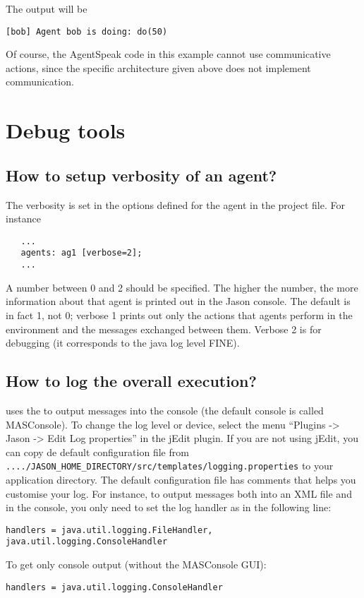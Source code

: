 \documentclass{article}
\newcommand{\jason}[0]{\htlink{\textit{Jason}}{http://jason.sf.net}\xspace}
\begin{document}
The output will be 
\begin{verbatim}
[bob] Agent bob is doing: do(50)
\end{verbatim}

Of course, the AgentSpeak code in this example cannot use communicative
actions, since the specific architecture given above does not implement
communication.

\section{Debug tools}

\subsection{How to setup verbosity of an agent?}

The verbosity is set in the options defined for the agent in the project file. For instance

\begin{verbatim}
   ... 
   agents: ag1 [verbose=2];
   ...
\end{verbatim}

A number between 0 and 2 should be specified. The higher the number,
the more information about that agent is printed out in the Jason
console. The default is in fact 1, not 0; verbose 1 prints out only
the actions that agents perform in the environment and the messages
exchanged between them. Verbose 2 is for debugging (it corresponds to
the java log level FINE).

\subsection{How to log the overall execution?}

\jason uses the 
to output messages into the console (the default console is called
MASConsole). To change the log level or device, select the menu
``Plugins -> Jason -> Edit Log properties'' in the jEdit plugin. If
you are not using jEdit, you can copy de default configuration file
from
\texttt{..../JASON_HOME_DIRECTORY/src/templates/logging.properties} to
your application directory. The default configuration file has
comments that helps you customise your log. For instance, to output
messages both into an XML file and in the console, you only need to
set the log handler as in the following line:
\begin{verbatim}
handlers = java.util.logging.FileHandler, java.util.logging.ConsoleHandler
\end{verbatim}
To get only console output (without the MASConsole GUI):
\begin{verbatim}
handlers = java.util.logging.ConsoleHandler
\end{verbatim}
\end{document}
